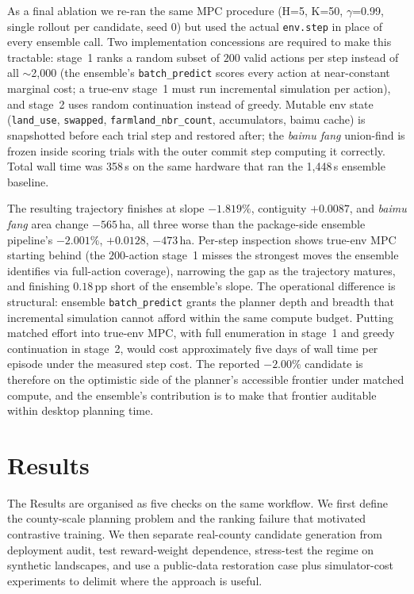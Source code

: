 \documentclass[11pt]{article}
\begin{document}
As a final ablation we re-ran the same MPC procedure (H=5, K=50, $\gamma$=0.99, single rollout per candidate, seed 0) but used the actual \texttt{env.step} in place of every ensemble call. Two implementation concessions are required to make this tractable: stage~1 ranks a random subset of $200$ valid actions per step instead of all $\sim$2{,}000 (the ensemble's \texttt{batch\_predict} scores every action at near-constant marginal cost; a true-env stage~1 must run incremental simulation per action), and stage~2 uses random continuation instead of greedy. Mutable env state (\texttt{land\_use}, \texttt{swapped}, \texttt{farmland\_nbr\_count}, accumulators, baimu cache) is snapshotted before each trial step and restored after; the \textit{baimu fang} union-find is frozen inside scoring trials with the outer commit step computing it correctly. Total wall time was 358\,s on the same hardware that ran the 1{,}448\,s ensemble baseline.

The resulting trajectory finishes at slope $-1.819\%$, contiguity $+0.0087$, and \textit{baimu fang} area change $-565$\,ha, all three worse than the package-side ensemble pipeline's $-2.001\%$, $+0.0128$, $-473$\,ha. Per-step inspection shows true-env MPC starting behind (the $200$-action stage~1 misses the strongest moves the ensemble identifies via full-action coverage), narrowing the gap as the trajectory matures, and finishing $0.18$\,pp short of the ensemble's slope. The operational difference is structural: ensemble \texttt{batch\_predict} grants the planner depth and breadth that incremental simulation cannot afford within the same compute budget. Putting matched effort into true-env MPC, with full enumeration in stage~1 and greedy continuation in stage~2, would cost approximately five days of wall time per episode under the measured step cost. The reported $-2.00\%$ candidate is therefore on the optimistic side of the planner's accessible frontier under matched compute, and the ensemble's contribution is to make that frontier auditable within desktop planning time.

\section{Results}\label{sec:results}

The Results are organised as five checks on the same workflow. We first define the county-scale planning problem and the ranking failure that motivated contrastive training. We then separate real-county candidate generation from deployment audit, test reward-weight dependence, stress-test the regime on synthetic landscapes, and use a public-data restoration case plus simulator-cost experiments to delimit where the approach is useful.
\end{document}
